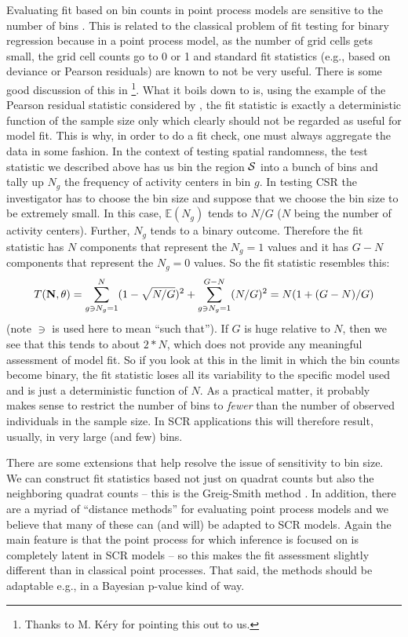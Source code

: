 Evaluating fit based on bin counts in point process models are
sensitive to the number of bins \citep[][p. 87-88]{illian_etal:2008}.
This is related to the classical problem of fit testing for binary
regression because in a point process model, as the number of grid
cells gets small, the grid cell counts go to 0 or 1 and standard fit
statistics (e.g., based on deviance or Pearson residuals) are known to
not be very useful.  There is some good discussion of this in
\citet[][sec. 4.4.5]{mccullagh_nelder:1989}\footnote{Thanks to
  M. K\'{e}ry for pointing this out to us.}.  What it boils down to is, using
the example of the Pearson residual statistic considered by
\citet{mccullagh_nelder:1989}, the fit statistic is exactly a
deterministic function of the sample size only which clearly should
not be regarded as useful for model fit. This is why, in order to do a
fit check, one must always
aggregate the data in some fashion.  In the context of testing spatial
randomness, the test statistic we described above has us bin the
region ${\cal S}$ into a bunch of bins and tally up $N_{g}$ the
frequency of activity centers in bin $g$.  In testing CSR the
investigator has to choose the bin size and suppose that we choose the
bin size to be extremely small.  In this case, $\mathbb{E}(N_{g})$
tends to $N/G$ ($N$ being the number of activity centers).  Further,
$N_{g}$ tends to a binary outcome. Therefore the fit statistic has $N$
components that represent the $N_{g} = 1$ values and it has $G-N$
components that represent the $N_{g} = 0$ values. So the fit statistic
resembles this:
\[
T({\bf N},\theta) = \sum_{g \ni N_{g} = 1}^{N}  (1 - \sqrt{N/G})^2 +
\sum_{g \ni N_{g} = 1}^{G-N} (N/G)^2
 = N(1 + (G-N)/G)
\]
(note $\ni$ is used here to mean ``such that'').  If $G$ is huge
relative to $N$, then we see that this tends to about $2*N$, which
does not provide any meaningful assessment of model fit.  So if you
look at this in the limit in which the bin counts become binary, the
fit statistic loses all its variability to the specific model used and
is just a deterministic function of $N$. As a practical matter, it
probably makes sense to restrict the number of bins to {\it fewer}
than the number of observed individuals in the sample size. In SCR
applications this will therefore result, usually, in very large (and
few) bins.


There are some extensions that help resolve the issue of sensitivity
to bin size. We can construct fit statistics based not just
on quadrat counts but also the neighboring quadrat counts -- this is
the Greig-Smith method \citep{greig-smith:1964}.
In addition, there are a myriad of ``distance
methods'' for evaluating point process models and we believe that many
of these can (and will) be adapted to SCR models. Again the main
feature is that the point process for which inference is focused on is
completely latent in SCR models -- so this makes the fit assessment
slightly different than in classical point processes. That said, the
methods should be adaptable e.g., in a Bayesian p-value kind of way.


